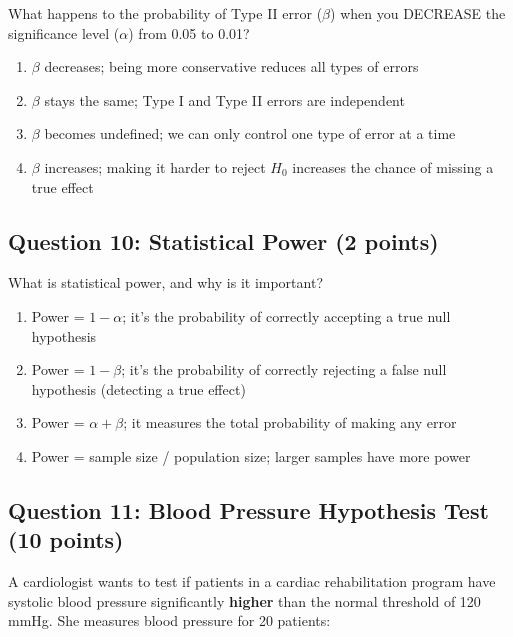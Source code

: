\documentclass[11pt]{article}
\begin{document}
What happens to the probability of Type II error ($\beta$) when you DECREASE the significance level ($\alpha$) from 0.05 to 0.01?

\begin{enumerate}[label=\Alph*)]
\item $\beta$ decreases; being more conservative reduces all types of errors
\item $\beta$ stays the same; Type I and Type II errors are independent
\item $\beta$ becomes undefined; we can only control one type of error at a time
\item $\beta$ increases; making it harder to reject $H_0$ increases the chance of missing a true effect
\end{enumerate}

\vspace{0.5cm}

\subsection*{Question 10: Statistical Power (2 points)}

What is statistical power, and why is it important?

\begin{enumerate}[label=\Alph*)]
\item Power = $1 - \alpha$; it's the probability of correctly accepting a true null hypothesis
\item Power = $1 - \beta$; it's the probability of correctly rejecting a false null hypothesis (detecting a true effect)
\item Power = $\alpha + \beta$; it measures the total probability of making any error
\item Power = sample size / population size; larger samples have more power
\end{enumerate}

\vspace{0.5cm}

\subsection*{Question 11: Blood Pressure Hypothesis Test (10 points)}

A cardiologist wants to test if patients in a cardiac rehabilitation program have systolic blood pressure significantly \textbf{higher} than the normal threshold of 120 mmHg. She measures blood pressure for 20 patients:
\end{document}
